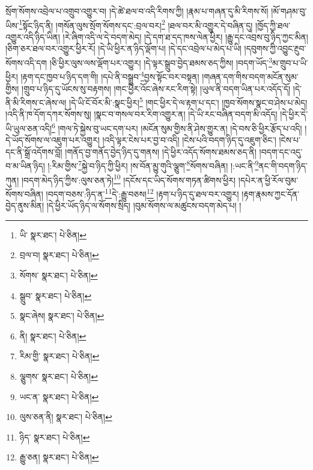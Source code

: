སྲོག་སོགས་འབྲེལ་པ་འགྲུབ་འགྱུར་བ། །དེ་ཚེ་ཐལ་བ་འདི་རིགས་ཀྱི། །རྣམ་པ་གཞན་དུ་མི་རིགས་སོ། །མོ་གཤམ་བུ་ཡིས་\footnote{ཡི་  སྣར་ཐང་།  པེ་ཅིན། }སྟོང་ཉིད་ནི། །གསོན་ལུས་སྲོག་སོགས་དང་:བྲལ་བར།\footnote{བྲལ་བ།  སྣར་ཐང་།  པེ་ཅིན། } །ཐལ་བར་མི་འགྱུར་དེ་བཞིན་དུ། །ཁྱོད་ཀྱི་ཐལ་འགྱུར་འདི་ཉིད་ཡིན། །རེ་ཞིག་འདི་ལ་དེ་བདག་མེད། །དེ་དག་ཐ་དད་ཁས་ལེན་ཕྱིར། །རྒྱུ་དང་འབྲས་བུ་ཉིད་ཀྱང་མིན། །ཅིག་ཅར་ཐལ་བར་འགྱུར་ཕྱིར་རོ། །དེ་ཡི་ཕྱིར་ན་ཉིད་ལྡོག་པ། །དེ་དང་འབྲེལ་པ་མེད་པ་ཡི། །དབུགས་ཀྱི་འབྱུང་རྔུབ་སོགས་འདི་དག །ཅི་ཕྱིར་ལུས་ལས་ལྡོག་པར་འགྱུར། །དེ་ལྟར་སྒྲུབ་བྱེད་ཐམས་ཅད་ཀྱིས། །བདག་ཡོད་\footnote{སོགས་  སྣར་ཐང་།  པེ་ཅིན། }མ་གྲུབ་པ་ཡི་ཕྱིར། །རྟག་དང་ཁྱབ་པ་ཉིད་དག་གི། །དཔེ་ནི་བསྒྲུབ་\footnote{སྒྲུབ་  སྣར་ཐང་།  པེ་ཅིན། }བྱས་སྟོང་བར་བསྟན། །གཞན་དག་གིས་བདག་མངོན་སུམ་གྱིས། །གྲུབ་པ་ཉིད་དུ་ཡོངས་སུ་བརྟགས། །གང་ཕྱིར་འོང་ཞེས་རང་རིག་སྟེ། །ཡུལ་ནི་བདག་ཡིན་པར་འདོད་དོ། །དེ་ནི་མི་རིགས་ང་ཞེས་ལ། །དེ་ཡི་ངོ་བོར་མི་:སྣང་ཕྱིར།\footnote{སྣང་ཞེས།  སྣར་ཐང་།  པེ་ཅིན། } །གང་ཕྱིར་དེ་ལ་རྟག་པ་དང་། །ཁྱབ་སོགས་སྣང་བ་ཤེས་པ་མེད། །འདི་ནི་ཁ་དོག་དཀར་སོགས་སུ། །སྣང་བ་གསལ་བར་རིག་འགྱུར་ན། །དེ་ཡི་རང་བཞིན་བདག་མི་འདོད། །དེ་ཕྱིར་དེ་ཡི་ཡུལ་ཅན་འདི།\footnote{ནི།  སྣར་ཐང་།  པེ་ཅིན། } །གལ་ཏེ་སྐྱེས་བུ་ཡང་དག་པར། །མངོན་སུམ་གྱིས་ནི་ཤེས་གྱུར་ན། །དེ་བས་ཅི་ཕྱིར་རྩོད་པ་འདི། །དེ་ཡོད་སོགས་ལ་འཇུག་པར་འགྱུར། །འདི་ལྟར་ངེས་པར་བྱ་བ་འདི། །ངེས་པའི་བདག་ཉིད་དུ་འཇུག་ཅིང་། །ངེས་པ་དང་ནི་སྒྲོ་འདོགས་བློ། །གནོད་བྱ་གནོད་བྱེད་ཉིད་དུ་གནས། །དེ་ཕྱིར་འདོད་སོགས་ཐམས་ཅད་ནི། །བདག་དང་འདུ་བ་མ་ཡིན་ཉིད། །:རིམ་གྱིས་\footnote{རིམ་གྱི་  སྣར་ཐང་།  པེ་ཅིན། }སྐྱེ་བ་ཉིད་ཀྱི་ཕྱིར། །ས་བོན་མྱུ་གུའི་ལྕུག་\footnote{ལྕུགས་  སྣར་ཐང་།  པེ་ཅིན། }སོགས་བཞིན། །:ཡང་ནི་\footnote{ཡང་ན་  སྣར་ཐང་།  པེ་ཅིན། }ནང་གི་བདག་ཉིད་ཀུན། །བདག་མེད་ཉིད་ཀྱིས་:ལུས་ཅན་ཏེ།\footnote{ལུས་ཅན་ནི།  སྣར་ཐང་།  པེ་ཅིན། } །དངོས་དང་ཡིད་སོགས་གཏན་ཚིགས་ཕྱིར། །དཔེར་ན་ཕྱི་རོལ་བུམ་སོགས་བཞིན། །བདག་བཅས་:ཉིད་ན་\footnote{ཉིད་  སྣར་ཐང་།  པེ་ཅིན། }དེ་:རྒྱུ་བཅས།\footnote{རྒྱུ་ཅན།  སྣར་ཐང་།  པེ་ཅིན། } །རྟག་པ་ཉིད་དུ་ཐལ་བར་འགྱུར། །རྟག་རྣམས་ཀྱང་དོན་བྱེད་ནུས་མིན། །དེ་ཕྱིར་ཡོད་ཉིད་ལ་སོགས་སྲིད། །བུམ་སོགས་ལ་མཚུངས་བདག་མེད་པ། །
